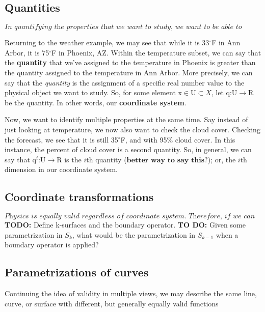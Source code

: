 \documentclass{book}
\begin{document}
\subsection{Quantities}
$\textit{In quantifying the properties that we want to study, we want to be able to compare two objects with the same "sort" of property, and maybe we also want to identify multiple parameters at the same time.}$


Returning to the weather example, we may see that while it is 33$^{\circ}$F in Ann Arbor, it is 75$^{\circ}$F in Phoenix, AZ. Within the temperature subset, we can say that the \textbf{quantity} that we've assigned to the temperature in Phoenix is greater than the quantity assigned to the temperature in Ann Arbor. More precisely, we can say that the \textit{quantity} is the assignment of a specific real number value to the physical object we want to study. So, for some element $\mathrm{x} \in \mathrm{U} \subset {X}$, let $\mathrm{q}$:$\mathrm{U} \to \mathrm{R}$ be the quantity. In other words, our \textbf{coordinate system}. 

Now, we want to identify multiple properties at the same time. Say instead of just looking at temperature, we now also want to check the cloud cover. Checking the forecast, we see that it is still 35$^{\circ}$F, and with 95\% cloud cover. In this instance, the percent of cloud cover is a second quantity. So, in general, we can say that $\mathrm{q}^{i}$:$\mathrm{U} \to \mathrm{R}$ is the $\textit{i}$th quantity ($\textbf{better way to say this?}$); or, the $\textit{i}$th dimension in our coordinate system. 

\subsection{Coordinate transformations}
$\textit{Physics is equally valid regardless of coordinate system. Therefore, if we can describe a physical phenomenon in one frame of reference, we should be able to convert that description into another frame of reference. }$
\textbf{TODO: } Define k-surfaces and the boundary operator. 
\textbf{TO DO:} Given some parametrization in $S_{k}$, what would be the parametrization in $S_{k-1}$ when a boundary operator is applied?

\subsection{Parametrizations of curves}
Continuing the idea of validity in multiple views, we may describe the same line, curve, or surface with different, but generally equally valid functions
\end{document}
